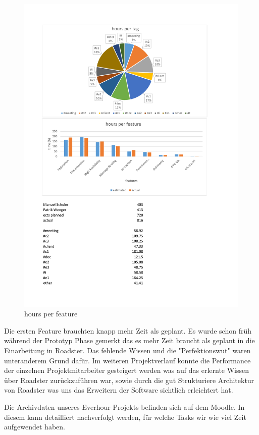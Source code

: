 
\begin{figure}[]
	\includegraphics[trim=2cm 11cm 3.5cm 11.5cm, clip=true, width=\textwidth]{img/project_monitoring_diagrams.pdf}
	\caption{hours per feature}
	\label{fig:hours:per:feature}
\end{figure}

Die ersten Feature brauchten knapp mehr Zeit als geplant. Es wurde schon früh während der Prototyp Phase
gemerkt das es mehr Zeit braucht als geplant in die Einarbeitung in Roadster. Das fehlende Wissen und
die "Perfektionswut" waren unteranderem Grund dafür.
Im weiteren Projektverlauf konnte die Performance der einzelnen Projektmitarbeiter gesteigert werden
was auf das erlernte Wissen über Roadster zurückzuführen war, sowie durch die gut
Strukturiere Architektur von Roadster was uns das Erweitern der Software sichtlich erleichtert hat.


Die Archivdaten unseres Everhour Projekts befinden sich auf dem Moodle. 
In diesem kann detailliert nachverfolgt werden, 
für welche Tasks wir wie viel Zeit aufgewendet haben.

